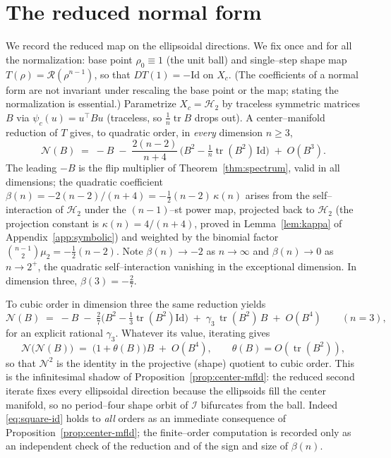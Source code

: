 \documentclass[10pt,a4paper]{amsart}
\newcommand{\Rad}{\mathcal{R}}
\newcommand{\IB}{\mathcal{I}}
\newcommand{\Hd}[1]{\mathcal{H}_{#1}}
\DeclareMathOperator{\tr}{tr}
\begin{document}
\section{The reduced normal form}\label{sec:normalform}

We record the reduced map on the ellipsoidal directions. We fix once and for
all the normalization: base point $\rho_0\equiv1$ (the unit ball) and
single--step shape map $T(\rho)=\Rad(\rho^{n-1})$, so that $DT(1)=-\mathrm{Id}$
on $X_c$. (The coefficients of a normal form are not invariant under rescaling
the base point or the map; stating the normalization is essential.) Parametrize
$X_c=\Hd2$ by traceless symmetric matrices $B$ via $\psi_c(u)=u^\top B u$
(traceless, so $\tfrac1n\tr B$ drops out). A center--manifold reduction of $T$
gives, to quadratic order, in \emph{every} dimension $n\ge3$,
\begin{equation}\label{eq:normalform}
   \mathcal N(B)\;=\;-B\;-\;\frac{2(n-2)}{n+4}\,
   \Big(B^2-\tfrac1n\tr(B^2)\,\mathrm{Id}\Big)\;+\;O(B^3).
\end{equation}
The leading $-B$ is the flip multiplier of Theorem~\ref{thm:spectrum}, valid in
all dimensions; the quadratic coefficient
$\beta(n)=-2(n-2)/(n+4)=-\tfrac12(n-2)\,\kappa(n)$ arises from the
self--interaction of $\Hd2$ under the $(n-1)$--st power map, projected back to
$\Hd2$ (the projection constant is $\kappa(n)=4/(n+4)$, proved in
Lemma~\ref{lem:kappa} of Appendix~\ref{app:symbolic}) and weighted by the
binomial factor $\binom{n-1}{2}\mu_2=-\tfrac12(n-2)$. Note $\beta(n)\to-2$ as
$n\to\infty$ and $\beta(n)\to0$ as $n\to2^+$, the quadratic self--interaction
vanishing in the exceptional dimension. In dimension three,
$\beta(3)=-\tfrac{2}{7}$.

To cubic order in dimension three the same reduction yields
\begin{equation}\label{eq:normalform3}
   \mathcal N(B)\;=\;-B\;-\;\tfrac{2}{7}\big(B^2-\tfrac13\tr(B^2)\mathrm{Id}\big)
   \;+\;\gamma_3\,\tr(B^2)\,B\;+\;O(B^4)\qquad(n=3),
\end{equation}
for an explicit rational $\gamma_3$. Whatever its value, iterating gives
\begin{equation}\label{eq:square-id}
   \mathcal N\big(\mathcal N(B)\big)\;=\;\big(1+\theta(B)\big)B\;+\;O(B^4),
   \qquad \theta(B)=O(\tr(B^2)),
\end{equation}
so that $\mathcal N^{2}$ is the identity in the projective (shape) quotient to
cubic order. This is the infinitesimal shadow of
Proposition~\ref{prop:center-mfld}: the reduced second iterate fixes every
ellipsoidal direction because the ellipsoids fill the center manifold, so no
period--four shape orbit of $\IB$ bifurcates from the ball. Indeed
\eqref{eq:square-id} holds to \emph{all} orders as an immediate consequence of
Proposition~\ref{prop:center-mfld}; the finite--order computation is recorded
only as an independent check of the reduction and of the sign and size of
$\beta(n)$.
\end{document}
